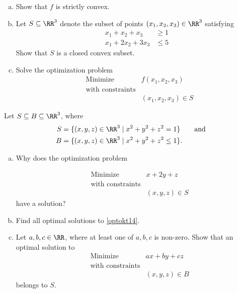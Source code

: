 \documentclass{article}
\begin{document}
\begin{enumerate}[(a)]
\item
  Show that $f$ is strictly convex.
\item
Let $S \subseteq \RR^3$ denote the subset of points $(x_1, x_2, x_3)\in \RR^3$ satisfying
\begin{align*}
x_1 + x_2 + x_3 &\geq 1\\
x_1 + 2 x_2 + 3 x_3 &\leq 5
\end{align*}
Show that $S$ is a closed convex subset.
\item
Solve the optimization problem
  \begin{align}\label{optokt13}
    &\text{Minimize} &f(x_1, x_2, x_3)\\
    &\text{with constraints}\\
    &&(x_1, x_2, x_3)\in S
  \end{align}
\end{enumerate}
\endshex

\beginshex

Let $S\subseteq B \subseteq \RR^3$, where 
\begin{align*}
S &= \{(x, y, z)\in \RR^3 \mid x^2 + y^2 + z^2 = 1\}\qquad\text{and}\\
B &= \{(x, y, z)\in \RR^3 \mid x^2 + y^2 + z^2 \leq 1\}.
\end{align*}


\begin{enumerate}[(a)]
\item
  Why does the optimization problem

  \begin{align}\label{optokt14}
    &\text{Minimize} &x + 2y + z\\
    &\text{with constraints}\\
    &&(x, y, z)\in S
\end{align}
have a solution?
\item
Find all optimal solutions to \eqref{optokt14}.  
\item
Let $a, b, c\in \RR$, where at least one of $a, b, c$ is non-zero. Show that an optimal solution to
  \begin{align*}
    &\text{Minimize} &a x + b y + c z\\
    &\text{with constraints}\\
    &&(x, y, z)\in B
\end{align*}
belongs to $S$.
\end{enumerate}
\endshex
\end{document}
